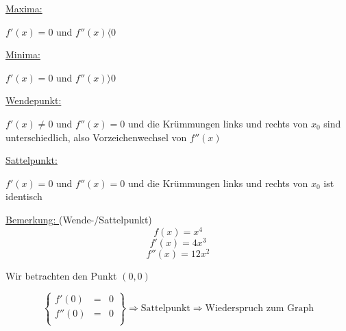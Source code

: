 \documentclass[11pt]{amsart}
\theoremstyle{remark}
\begin{document}
\underline{Maxima:} \\
	\begin{center}
		$f'(x)=0$ und $f''(x) \langle 0$
	\end{center}

\underline{Minima:} \\
	\begin{center}
		$f'(x)=0$ und $f''(x) \rangle 0$
	\end{center}
\underline{Wendepunkt:} \\
	\begin{center}
		$f'(x)\neq0$ und $f''(x)= 0$ und die Kr\"ummungen links und rechts von $x_0$ sind unterschiedlich, also Vorzeichenwechsel von $f''(x)$
	\end{center}
\underline{Sattelpunkt:} \\
	\begin{center}
		$f'(x)=0$ und $f''(x)= 0$ und die Kr\"ummungen links und rechts von $x_0$ ist identisch
	\end{center}
\underline{Bemerkung: } (Wende-/Sattelpunkt)\\
	\begin{equation*}
		f(x)=x^4
	\end{equation*}
	\begin{equation*}
		f'(x)=4x^3
	\end{equation*}
	\begin{equation*}
		f''(x)=12x^2
	\end{equation*}
	\newpage
	\begin{center}
		Wir betrachten den Punkt $(0,0)$
		\begin{figure}[h]
	 \end{figure}
	\end{center}
	\begin{equation*}
		\left\lbrace \begin{array}{ccc}
			  f'(0) & = & 0\\
			  f''(0) & = & 0\\
		\end{array}\right\rbrace 
		\Rightarrow \text{Sattelpunkt}\Rightarrow \text{Wiederspruch zum Graph}
	\end{equation*}
\end{document}
